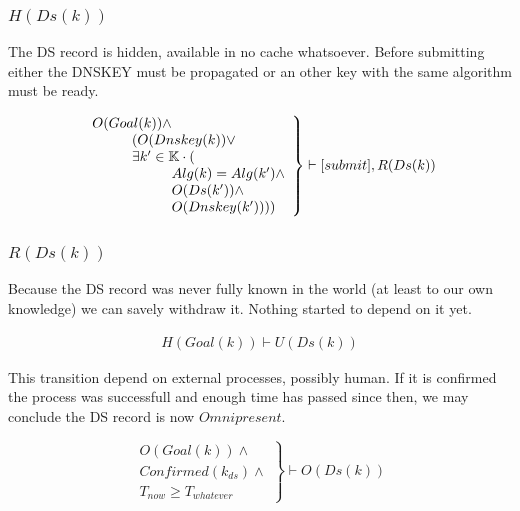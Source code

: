 \documentclass[twoside,english, a4paper]{article}
\newcommand{\mathbox}[1]{#1}
\begin{document}
\subsubsection{$H(Ds(k))$}



	
	The DS record is hidden, available in no cache whatsoever.
	Before submitting either the DNSKEY must be propagated or an other 
	key with the same algorithm must be ready.
	
	\begin{equation}
		\left.
		\begin{array}{l}
			O(Goal(k)) \wedge \\
\hskip 1cm		(O(Dnskey(k)) \vee \\
\hskip 1cm		\exists k' \in \mathbb{K} \cdot ( \\
\hskip 2cm			Alg(k)=Alg(k') \wedge \\
\hskip 2cm			O(Ds(k')) \wedge \\
\hskip 2cm			O(Dnskey(k'))))
		\end{array}
		\right\}\vdash [submit], R(Ds(k)) 
	\end{equation}

\subsubsection{$R(Ds(k))$}

\mathbox{
	
	Because the DS record was never fully known in the world (at 
	least to our own knowledge) we can savely withdraw it. Nothing 
	started to depend on it yet.
	
	\begin{equation}
		\begin{split}
			H(Goal(k)) \vdash U(Ds(k))
		\end{split}
	\end{equation}

	This transition depend on external processes, possibly human. If it 
	is confirmed the process was successfull and enough time has passed
	since then, we may conclude the DS record is now $Omnipresent$.
	
	\begin{equation}
		\left.
		\begin{array}{l}
			O(Goal(k)) \wedge \\
			Confirmed(k_{ds}) \wedge \\
			T_{now} \geq T_{whatever}
		\end{array}
		\right\}\vdash O(Ds(k))
	\end{equation}
}
\end{document}
